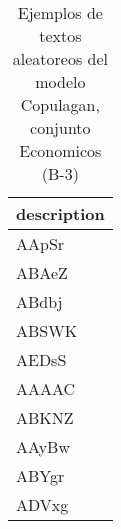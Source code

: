 \begin{table}[H]
\centering
\fontsize{8}{14}\selectfont
\caption{Ejemplos de textos aleatoreos del modelo Copulagan, conjunto Economicos (B-3)}
\label{table-sample10-economicos-b-3-copulagan-text}
\begin{tabular}{|m{50em}|}
\hline
\rowcolor[gray]{0.8}
description \\
\hline AApSr \\
\hline ABAeZ \\
\hline ABdbj \\
\hline ABSWK \\
\hline AEDsS \\
\hline AAAAC \\
\hline ABKNZ \\
\hline AAyBw \\
\hline ABYgr \\
\hline ADVxg \\
\hline
\end{tabular}
\end{table}
